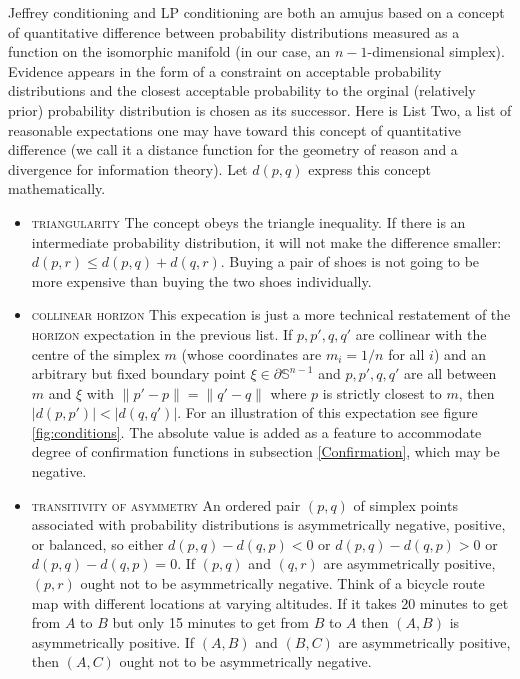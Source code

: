 \documentclass[11pt]{article}
\begin{document}
Jeffrey conditioning and LP conditioning are both an amujus based on a
concept of quantitative difference between probability distributions
measured as a function on the isomorphic manifold (in our case, an
$n-1$-dimensional simplex). Evidence appears in the form of a
constraint on acceptable probability distributions and the closest
acceptable probability to the orginal (relatively prior) probability
distribution is chosen as its successor. Here is List
Two\label{page:listtwo}, a list of reasonable expectations one may
have toward this concept of quantitative difference (we call it a
distance function for the geometry of reason and a divergence for
information theory). Let $d(p,q)$ express this concept mathematically.

\begin{itemize}
\item \textsc{triangularity} The concept obeys the triangle
  inequality. If there is an intermediate probability distribution, it
  will not make the difference smaller: $d(p,r)\leq{}d(p,q)+d(q,r)$.
  Buying a pair of shoes is not going to be more expensive than buying
  the two shoes individually.
\item \textsc{collinear horizon} This expecation is just a more
  technical restatement of the \textsc{horizon} expectation in the
  previous list. If $p,p',q,q'$ are collinear with the centre of the
  simplex $m$ (whose coordinates are $m_{i}=1/n$ for all $i$) and an
  arbitrary but fixed boundary point $\xi\in\partial\mathbb{S}^{n-1}$
  and $p,p',q,q'$ are all between $m$ and $\xi$ with
  $\|p'-p\|=\|q'-q\|$ where $p$ is strictly closest to $m$, then
  $|d(p,p')|<|d(q,q')|$. For an illustration of this expectation see
  figure \ref{fig:conditions}. The absolute value is added as a
  feature to accommodate degree of confirmation functions in
  subsection \ref{Confirmation}, which may be negative.
\item \textsc{transitivity of asymmetry} An ordered pair $(p,q)$ of
  simplex points associated with probability distributions is
  asymmetrically negative, positive, or balanced, so either
  $d(p,q)-d(q,p)<0$ or $d(p,q)-d(q,p)>0$ or $d(p,q)-d(q,p)=0$. If
  $(p,q)$ and $(q,r)$ are asymmetrically positive, $(p,r)$ ought not
  to be asymmetrically negative. Think of a bicycle route map with
  different locations at varying altitudes. If it takes 20 minutes to
  get from $A$ to $B$ but only 15 minutes to get from $B$ to $A$ then
  $(A,B)$ is asymmetrically positive. If $(A,B)$ and $(B,C)$ are
  asymmetrically positive, then $(A,C)$ ought not to be asymmetrically
  negative.
\end{itemize}
\end{document}
